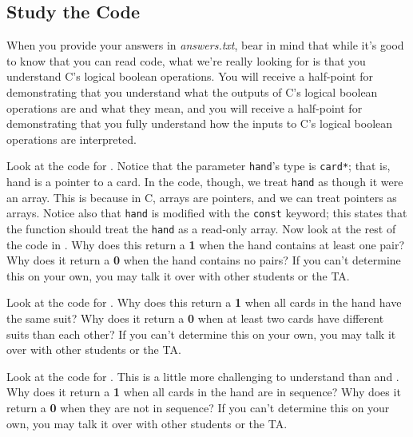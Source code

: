 \subsection{Study the Code} \label{subsec:studythecode}

When you provide your answers in \textit{answers.txt}, bear in mind that while it's good to know that you can read code, what we're really looking for is that you understand C's logical boolean operations.
You will receive a half-point for demonstrating that you understand what the outputs of C's logical boolean operations are and what they mean,
and you will receive a half-point for demonstrating that you fully understand how the inputs to C's logical boolean operations are interpreted.

Look at the code for .
Notice that the parameter \lstinline{hand}'s type is \lstinline{card*};
that is, \lstinline{}{hand} is a pointer to a \lstinline{}{card}.
In the code, though, we treat \lstinline{hand} as though it were an array.
This is because in C, arrays are pointers, and we can treat pointers as arrays.
Notice also that \lstinline{hand} is modified with the \lstinline{const} keyword;
this states that the  function should treat the \lstinline{hand} as a read-only array.
Now look at the rest of the code in .
Why does this return a \textbf{1} when the hand contains at least one pair?
Why does it return a \textbf{0} when the hand contains no pairs?
If you can't determine this on your own, you may talk it over with other students or the TA\@.
\begin{description}
\end{description}

Look at the code for .
Why does this return a \textbf{1} when all cards in the hand have the same suit?
Why does it return a \textbf{0} when at least two cards have different suits than each other?
If you can't determine this on your own, you may talk it over with other students or the TA\@.
\begin{description}
\end{description}

Look at the code for .
This is a little more challenging to understand than  and .
Why does it return a \textbf{1} when all cards in the hand are in sequence?
Why does it return a \textbf{0} when they are not in sequence?
If you can't determine this on your own, you may talk it over with other students or the TA\@.
\begin{description}
\end{description}

